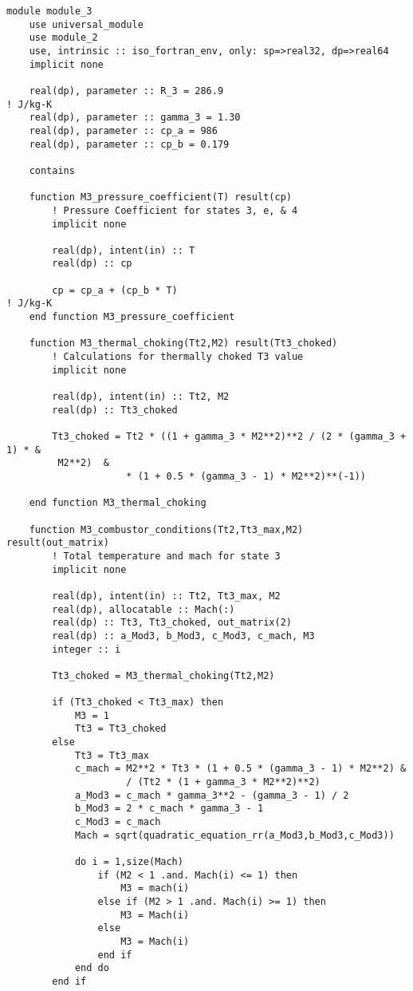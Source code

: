 \begin{verbatim}
module module_3
    use universal_module
    use module_2
    use, intrinsic :: iso_fortran_env, only: sp=>real32, dp=>real64
    implicit none

    real(dp), parameter :: R_3 = 286.9                                  ! J/kg-K
    real(dp), parameter :: gamma_3 = 1.30
    real(dp), parameter :: cp_a = 986
    real(dp), parameter :: cp_b = 0.179

    contains

    function M3_pressure_coefficient(T) result(cp)
        ! Pressure Coefficient for states 3, e, & 4
        implicit none

        real(dp), intent(in) :: T
        real(dp) :: cp

        cp = cp_a + (cp_b * T)                                          ! J/kg-K
    end function M3_pressure_coefficient

    function M3_thermal_choking(Tt2,M2) result(Tt3_choked)
        ! Calculations for thermally choked T3 value
        implicit none

        real(dp), intent(in) :: Tt2, M2
        real(dp) :: Tt3_choked

        Tt3_choked = Tt2 * ((1 + gamma_3 * M2**2)**2 / (2 * (gamma_3 + 1) * &
         M2**2)  &
                     * (1 + 0.5 * (gamma_3 - 1) * M2**2)**(-1))

    end function M3_thermal_choking

    function M3_combustor_conditions(Tt2,Tt3_max,M2) result(out_matrix)
        ! Total temperature and mach for state 3
        implicit none

        real(dp), intent(in) :: Tt2, Tt3_max, M2
        real(dp), allocatable :: Mach(:)
        real(dp) :: Tt3, Tt3_choked, out_matrix(2)
        real(dp) :: a_Mod3, b_Mod3, c_Mod3, c_mach, M3
        integer :: i

        Tt3_choked = M3_thermal_choking(Tt2,M2)

        if (Tt3_choked < Tt3_max) then
            M3 = 1
            Tt3 = Tt3_choked
        else
            Tt3 = Tt3_max
            c_mach = M2**2 * Tt3 * (1 + 0.5 * (gamma_3 - 1) * M2**2) &
                     / (Tt2 * (1 + gamma_3 * M2**2)**2)
            a_Mod3 = c_mach * gamma_3**2 - (gamma_3 - 1) / 2
            b_Mod3 = 2 * c_mach * gamma_3 - 1
            c_Mod3 = c_mach
            Mach = sqrt(quadratic_equation_rr(a_Mod3,b_Mod3,c_Mod3))

            do i = 1,size(Mach)
                if (M2 < 1 .and. Mach(i) <= 1) then
                    M3 = mach(i)
                else if (M2 > 1 .and. Mach(i) >= 1) then
                    M3 = Mach(i)
                else
                    M3 = Mach(i)
                end if
            end do
        end if


\end{verbatim}
